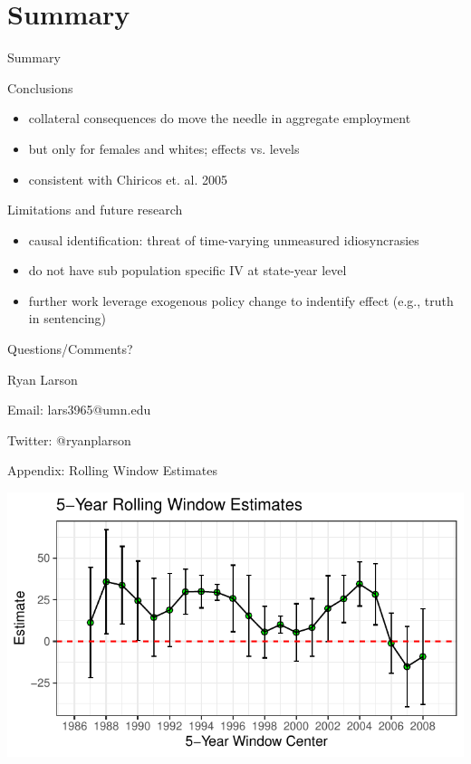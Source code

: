 \documentclass{beamer}\usepackage[]{graphicx}\usepackage[]{color}
\makeatletter
\def\maxwidth{ %
  \ifdim\Gin@nat@width>\linewidth
    \linewidth
  \else
    \Gin@nat@width
  \fi
}
\newenvironment{knitrout}{}{} %
\makeatother
\begin{document}
\section{Summary}

\begin{frame}{Summary}
\begin{block}{Conclusions}
\begin{itemize}
\item collateral consequences do move the needle in aggregate employment
\item but only for females and whites; effects vs. levels
\item consistent with Chiricos et. al. 2005
\end{itemize}
\end{block}

\begin{block}{Limitations and future research}
\begin{itemize}
\item causal identification: threat of time-varying unmeasured idiosyncrasies
\item do not have sub population specific IV at state-year level
\item further work leverage exogenous policy change to indentify effect (e.g., truth in sentencing)
\end{itemize}
\end{block}
\end{frame}

\begin{frame}{Questions/Comments?}

\begin{block}

\item Ryan Larson
\item Email: lars3965@umn.edu
\item Twitter: @ryanplarson

\end{block}

\end{frame}



\begin{frame}{Appendix: Rolling Window Estimates}



\begin{knitrout}
\color{fgcolor}
\includegraphics[width=\maxwidth]{figure/unnamed-chunk-13-1} 

\end{knitrout}


\end{frame}
\end{document}
